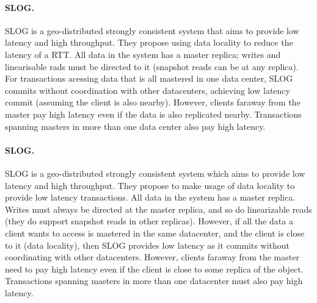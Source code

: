 
\paragraph{SLOG.} SLOG \cite{slog} is a geo-distributed strongly consistent system that aims to provide low latency and high throughput.
They propose using data locality to reduce the latency of a RTT.
All data in the system has a master replica; writes and linearisable rads must be directed to it (snapshot reads can be at any replica).
For transactions acessing data that is all mastered in one data center, SLOG commits without coordination with other datacenters, achieving low latency commit (assuming the client is also nearby).
However, clients faraway from the master pay high latency even if the data is also replicated nearby.
Transactions spanning masters in more than one data center also pay high latency.

\paragraph{SLOG.} SLOG \cite{slog} is a geo-distributed strongly consistent system which aims to provide low latency and high throughput.
They propose to make usage of data locality to provide low latency transactions.
All data in the system has a master replica.
Writes must always be directed at the master replica, and so do linearizable reads (they do support snapshot reads in other replicas).
However, if all the data a client wants to access is mastered in the same datacenter, and the client is close to it (data locality), then SLOG provides low latency as it commits without coordinating with other datacenters.
However, clients faraway from the master need to pay high latency even if the client is close to some replica of the object.
Transactions spanning masters in more than one datacenter must also pay high latency.

